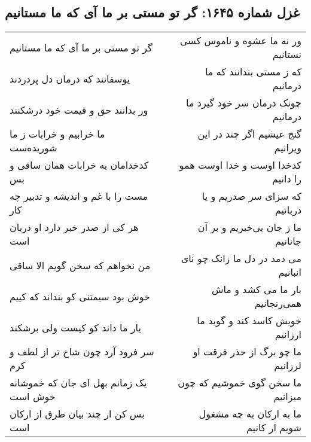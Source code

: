 \begin{center}
\section*{غزل شماره ۱۶۴۵: گر تو مستی بر ما آی که ما مستانیم}
\label{sec:1645}
\begin{longtable}{l p{0.5cm} r}
گر تو مستی بر ما آی که ما مستانیم
&&
ور نه ما عشوه و ناموس کسی نستانیم
\\
یوسفانند که درمان دل پردردند
&&
که ز مستی بندانند که ما درمانیم
\\
ور بدانند حق و قیمت خود درشکنند
&&
چونک درمان سر خود گیرد ما درمانیم
\\
ما خرابیم و خرابات ز ما شوریده‌ست
&&
گنج عیشیم اگر چند در این ویرانیم
\\
کدخدامان به خرابات همان ساقی و بس
&&
کدخدا اوست و خدا اوست همو را دانیم
\\
مست را با غم و اندیشه و تدبیر چه کار
&&
که سزای سر صدریم و یا دربانیم
\\
هر کی از صدر خبر دارد او دربان است
&&
ما ز جان بی‌خبریم و بر آن جانانیم
\\
من نخواهم که سخن گویم الا ساقی
&&
می دمد در دل ما زانک چو نای انبانیم
\\
خوش بود سیمتنی کو بنداند که کییم
&&
بار ما می کشد و ماش همی‌رنجانیم
\\
یار ما داند کو کیست ولی برشکند
&&
خویش کاسد کند و گوید ما ارزانیم
\\
سر فرود آرد چون شاخ تر از لطف و کرم
&&
ما چو برگ از حذر فرقت او لرزانیم
\\
یک زمانم بهل ای جان که خموشانه خوش است
&&
ما سخن گوی خموشیم که چون میزانیم
\\
بس کن ار چند بیان طرق از ارکان است
&&
ما به ارکان به چه مشغول شویم ار کانیم
\\
\end{longtable}
\end{center}
